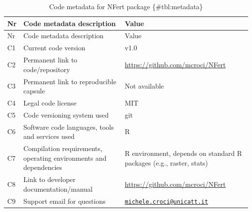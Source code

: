 \documentclass[
  11pt,
]{article}
\begin{document}
\begin{longtable}[]{@{}
  >{\raggedright\arraybackslash}p{}
  >{\raggedright\arraybackslash}p{}
  >{\raggedright\arraybackslash}p{}@{}}
\caption{Code metadata for NFert package
\{\#tbl:metadata\}}\tabularnewline
\toprule\noalign{}
\begin{minipage}[b]{\linewidth}\raggedright
Nr
\end{minipage} & \begin{minipage}[b]{\linewidth}\raggedright
Code metadata description
\end{minipage} & \begin{minipage}[b]{\linewidth}\raggedright
Value
\end{minipage} \\
\midrule\noalign{}
\endfirsthead
\toprule\noalign{}
\begin{minipage}[b]{\linewidth}\raggedright
Nr
\end{minipage} & \begin{minipage}[b]{\linewidth}\raggedright
Code metadata description
\end{minipage} & \begin{minipage}[b]{\linewidth}\raggedright
Value
\end{minipage} \\
\midrule\noalign{}
\endhead
\bottomrule\noalign{}
\endlastfoot
C1 & Current code version & v1.0 \\
C2 & Permanent link to code/repository &
\url{https://github.com/mcroci/NFert} \\
C3 & Permanent link to reproducible capsule & Not available \\
C4 & Legal code license & MIT \\
C5 & Code versioning system used & git \\
C6 & Software code languages, tools and services used & R \\
C7 & Compilation requirements, operating environments and dependencies &
R environment, depends on standard R packages (e.g., raster, stats) \\
C8 & Link to developer documentation/manual &
\url{https://github.com/mcroci/NFert} \\
C9 & Support email for questions &
\href{mailto:michele.croci@unicatt.it}{\nolinkurl{michele.croci@unicatt.it}} \\
\end{longtable}
\end{document}
